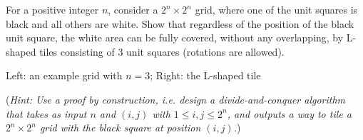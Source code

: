 \documentclass[11pt]{article}
\begin{document}
    \newpage

    \begin{tcolorbox}[title={Problem 3 (Grid Tiling, 35 pts)}]
        For a positive integer $n$, consider a $2^n \times 2^n$ grid, where one of the unit squares is black and all others are white. Show that regardless of the position of the black unit square, the white area can be fully covered, without any overlapping, by L-shaped tiles consisting of $3$ unit squares (rotations are allowed).
        
        \bigskip
        
        {
        \centering
        
        Left: an example grid with $n=3$; Right: the L-shaped tile
        
        }

        \bigskip
        
        (\emph{Hint: Use a proof by construction, i.e. design a divide-and-conquer algorithm that takes as input $n$ and $(i,j)$ with $1\leq i,j \leq 2^n$, and outputs a way to tile a $2^n\times 2^n$ grid with the black square at position $(i,j)$.}) 
        \medskip

             
    \end{tcolorbox}
    
    
\end{document}
